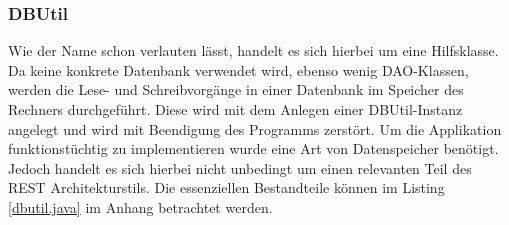 \documentclass[fleqn,10.5pt,ngerman]{SelfArx}
\begin{document}
\subsubsection{DBUtil}
Wie der Name schon verlauten lässt, handelt es sich hierbei um eine Hilfsklasse. Da keine konkrete Datenbank verwendet wird, ebenso wenig DAO-Klassen, werden die Lese- und Schreibvorgänge in einer Datenbank im Speicher des Rechners durchgeführt. Diese wird mit dem Anlegen einer DBUtil-Instanz angelegt und wird mit Beendigung des Programms zerstört. Um die Applikation funktionstüchtig zu implementieren wurde eine Art von Datenspeicher benötigt. Jedoch handelt es sich hierbei nicht unbedingt um einen relevanten Teil des REST Architekturstils. Die essenziellen Bestandteile können im Listing \ref{dbutil.java} im Anhang betrachtet werden.

\end{document}
